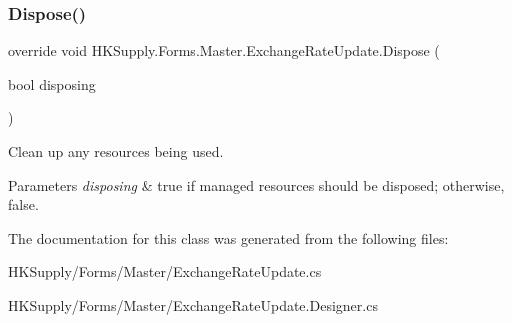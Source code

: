 \subsubsection{\texorpdfstring{Dispose()}{Dispose()}}
{\footnotesize\ttfamily override void H\+K\+Supply.\+Forms.\+Master.\+Exchange\+Rate\+Update.\+Dispose (\begin{DoxyParamCaption}\item[{bool}]{disposing }\end{DoxyParamCaption})\hspace{0.3cm}{\ttfamily [protected]}}



Clean up any resources being used. 


\begin{DoxyParams}{Parameters}
{\em disposing} & true if managed resources should be disposed; otherwise, false.\\
\hline
\end{DoxyParams}


The documentation for this class was generated from the following files\+:\begin{DoxyCompactItemize}
\item 
H\+K\+Supply/\+Forms/\+Master/Exchange\+Rate\+Update.\+cs\item 
H\+K\+Supply/\+Forms/\+Master/Exchange\+Rate\+Update.\+Designer.\+cs\end{DoxyCompactItemize}

